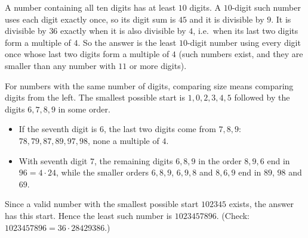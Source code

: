 A number containing all ten digits has at least $10$ digits. A $10$-digit such number uses each digit exactly once, so its digit sum is $45$ and it is divisible by $9$. It is divisible by $36$ exactly when it is also divisible by $4$, i.e.\ when its last two digits form a multiple of $4$. So the answer is the least $10$-digit number using every digit once whose last two digits form a multiple of $4$ (such numbers exist, and they are smaller than any number with $11$ or more digits).

For numbers with the same number of digits, comparing size means comparing digits from the left. The smallest possible start is $1,0,2,3,4,5$ followed by the digits $6,7,8,9$ in some order.
\begin{itemize}
\item If the seventh digit is $6$, the last two digits come from $7,8,9$: $78,79,87,89,97,98$, none a multiple of $4$.
\item With seventh digit $7$, the remaining digits $6,8,9$ in the order $8,9,6$ end in $96=4\cdot24$, while the smaller orders $6,8,9$, $6,9,8$ and $8,6,9$ end in $89$, $98$ and $69$.
\end{itemize}
Since a valid number with the smallest possible start $102345$ exists, the answer has this start.
Hence the least such number is $\boxed{1023457896}$. (Check: $1023457896=36\cdot28429386$.)
